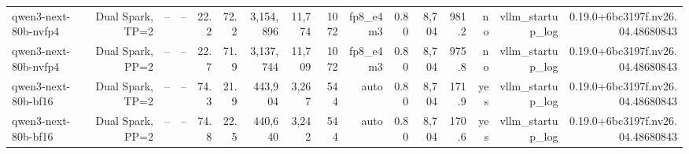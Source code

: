 \begin{tabular}{l r r r r r r r r r r r r r r r }
qwen3-next-80b-nvfp4 & Dual Spark, TP=2 & -- & -- & 22.2 & 72.2 & 3,154,896 & 11,774 & 1072 & fp8\_e4m3 & 0.80 & 8,704 & 981.2 & no & vllm\_startup\_log & 0.19.0+6bc3197f.nv26.04.48680843 \\
qwen3-next-80b-nvfp4 & Dual Spark, PP=2 & -- & -- & 22.7 & 71.9 & 3,137,744 & 11,709 & 1072 & fp8\_e4m3 & 0.80 & 8,704 & 975.8 & no & vllm\_startup\_log & 0.19.0+6bc3197f.nv26.04.48680843 \\
qwen3-next-80b-bf16 & Dual Spark, TP=2 & -- & -- & 74.3 & 21.9 & 443,904 & 3,267 & 544 & auto & 0.80 & 8,704 & 171.9 & yes & vllm\_startup\_log & 0.19.0+6bc3197f.nv26.04.48680843 \\
qwen3-next-80b-bf16 & Dual Spark, PP=2 & -- & -- & 74.8 & 22.5 & 440,640 & 3,242 & 544 & auto & 0.80 & 8,704 & 170.6 & yes & vllm\_startup\_log & 0.19.0+6bc3197f.nv26.04.48680843 \\
\bottomrule
\end{tabular}
